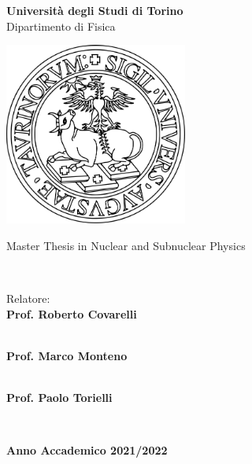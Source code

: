 \makeatletter
\begin{center}
{\LARGE \textbf{Università degli Studi di Torino}} \\
\vspace{0.2cm}
{\Large {Dipartimento di Fisica}} \\ 
\vspace{1cm}

\includegraphics[width=6cm]{Cover/img/unito-logo.png} \\
\vspace{1.1cm}

{\Large {Master Thesis in Nuclear and Subnuclear Physics}} \\
\vspace{1cm}

{\LARGE \textbf{\@title}} \\ 
\vspace{1.5cm}

\end{center}


\noindent
\begin{minipage}[t]{0.5\textwidth}
\noindent \large{Relatore:} \\
\large{\textbf{Prof. Roberto Covarelli}} \\
\vspace{0.1cm}

 \\
\large{\textbf{Prof. Marco Monteno}} \\
\vspace{0.1cm}

 \\
\large{\textbf{Prof. Paolo Torielli}} \\
\vspace{0.1cm}

\end{minipage}%
\begin{minipage}[t]{0.5\textwidth}
\hspace*{\fill} \mbox{
} \\
\end{minipage}

\vfill

\begin{center}
    \large{\textbf{Anno Accademico 2021/2022}}
\end{center}

\vspace{1cm}

\newpage